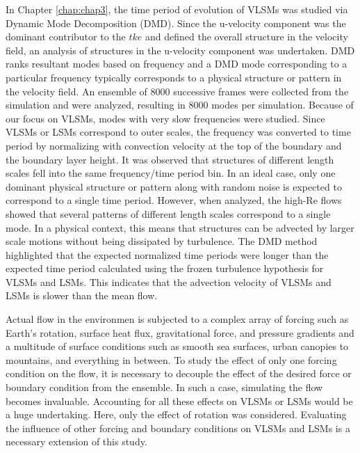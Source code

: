 In Chapter \ref{chap:chap3}, the time period of evolution of VLSMs was studied via Dynamic Mode Decomposition (DMD). Since the u-velocity component was the dominant contributor to the $tke$ and defined the overall structure in the velocity field,  an analysis of structures in the u-velocity component was undertaken. DMD ranks resultant modes based on frequency and a DMD mode corresponding to a particular frequency typically corresponds to a physical structure or pattern in the velocity field. An ensemble of 8000 successive frames were collected from the simulation and were analyzed, resulting in 8000 modes per simulation. Because of our focus on VLSMs, modes with very slow frequencies were studied. Since VLSMs or LSMs correspond to outer scales, the frequency was converted to time period by normalizing with convection velocity at the top of the boundary and the boundary layer height. It was observed that structures of different length scales fell into the same frequency/time period bin. In an ideal case, only one dominant physical structure or pattern along with random noise is expected to correspond to a single time period. However, when analyzed, the high-Re flows showed that several patterns of different length scales correspond to a single mode. In a physical context, this means that structures can be advected by larger scale motions without being dissipated by turbulence. The DMD method highlighted that the expected normalized time periods were longer than the expected time period calculated using the frozen turbulence hypothesis for VLSMs and LSMs. This indicates that the advection velocity of VLSMs and LSMs is slower than the mean flow. 

Actual flow in the environmen is subjected to a complex array of forcing such as Earth's rotation, surface heat flux, gravitational force, and pressure gradients and a multitude of surface conditions such as smooth sea surfaces, urban canopies to mountains, and everything in between. To study the effect of only one forcing condition on the flow, it is necessary to decouple the effect of the desired force or boundary condition from the ensemble. In such a case, simulating the flow becomes invaluable. Accounting for all these effects on VLSMs or LSMs would be a huge undertaking. Here, only the effect of rotation was considered. Evaluating the influence of other forcing and boundary conditions on VLSMs and LSMs is a necessary extension of this study. 


